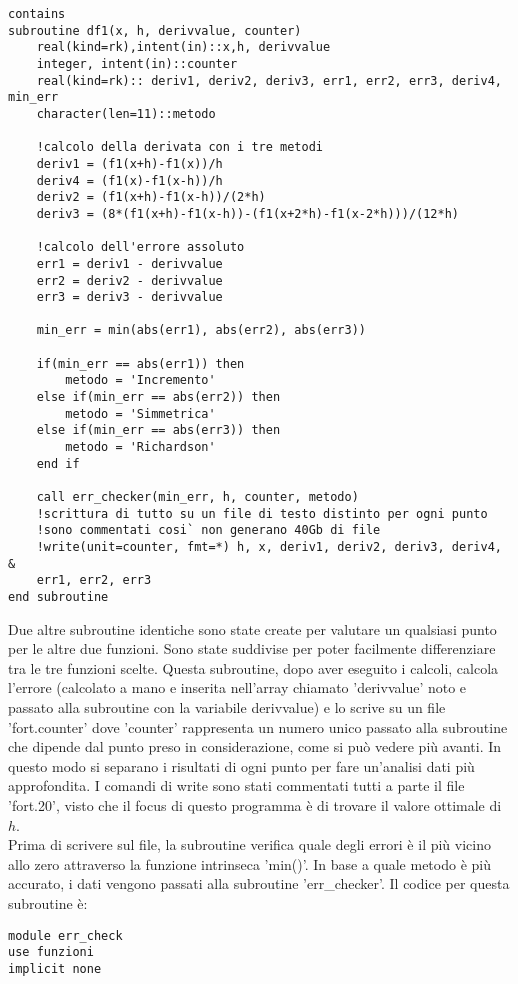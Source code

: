 \documentclass[a4paper]{article}
\begin{document}
{\begin{lstlisting}[firstnumber = 105]
contains 
subroutine df1(x, h, derivvalue, counter)
    real(kind=rk),intent(in)::x,h, derivvalue
    integer, intent(in)::counter
    real(kind=rk):: deriv1, deriv2, deriv3, err1, err2, err3, deriv4, min_err
    character(len=11)::metodo

    !calcolo della derivata con i tre metodi
    deriv1 = (f1(x+h)-f1(x))/h
    deriv4 = (f1(x)-f1(x-h))/h
    deriv2 = (f1(x+h)-f1(x-h))/(2*h)
    deriv3 = (8*(f1(x+h)-f1(x-h))-(f1(x+2*h)-f1(x-2*h)))/(12*h)

    !calcolo dell'errore assoluto
    err1 = deriv1 - derivvalue
    err2 = deriv2 - derivvalue
    err3 = deriv3 - derivvalue

    min_err = min(abs(err1), abs(err2), abs(err3))

    if(min_err == abs(err1)) then
        metodo = 'Incremento'
    else if(min_err == abs(err2)) then
        metodo = 'Simmetrica'
    else if(min_err == abs(err3)) then
        metodo = 'Richardson'
    end if
    
    call err_checker(min_err, h, counter, metodo)
    !scrittura di tutto su un file di testo distinto per ogni punto
    !sono commentati cosi` non generano 40Gb di file
    !write(unit=counter, fmt=*) h, x, deriv1, deriv2, deriv3, deriv4, &
    err1, err2, err3
end subroutine
\end{lstlisting}
Due altre subroutine identiche sono state create per valutare un qualsiasi punto per le altre due funzioni. Sono state suddivise per poter facilmente differenziare tra le tre funzioni scelte. Questa subroutine, dopo aver eseguito i calcoli, calcola l'errore (calcolato a mano e inserita nell'array chiamato 'derivvalue' noto e passato alla subroutine con la variabile derivvalue) e lo scrive su un file 'fort.counter' dove 'counter' rappresenta un numero unico passato alla subroutine che dipende dal punto preso in considerazione, come si può vedere più avanti. In questo modo si separano i risultati di ogni punto per fare un'analisi dati più approfondita. I comandi di write sono stati commentati tutti a parte il file 'fort.20', visto che il focus di questo programma è di trovare il valore ottimale di $h$. \\
Prima di scrivere sul file, la subroutine verifica quale degli errori è il più vicino allo zero attraverso la funzione intrinseca 'min()'. In base a quale metodo è più accurato, i dati vengono passati alla subroutine 'err\_checker'. Il codice per questa subroutine è:
\begin{lstlisting}[firstnumber = 24]
module err_check
use funzioni
implicit none


\end{lstlisting}}
\end{document}
